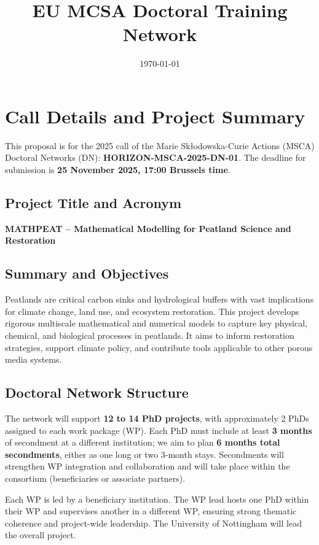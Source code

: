 \documentclass[12pt]{article}
\title{EU MCSA Doctoral Training Network}
\author{}
\date{\today}
\begin{document}
\maketitle

\section*{Call Details and Project Summary}

This proposal is for the 2025 call of the Marie Skłodowska-Curie Actions (MSCA) Doctoral Networks (DN): \textbf{HORIZON-MSCA-2025-DN-01}. The deadline for submission is \textbf{25 November 2025, 17:00 Brussels time}.

\subsection*{Project Title and Acronym}
\textbf{MATHPEAT – Mathematical Modelling for Peatland Science and Restoration}

\subsection*{Summary and Objectives}
Peatlands are critical carbon sinks and hydrological buffers with vast implications for climate change, land use, and ecosystem restoration. This project develops rigorous multiscale mathematical and numerical models to capture key physical, chemical, and biological processes in peatlands. It aims to inform restoration strategies, support climate policy, and contribute tools applicable to other porous media systems.

\subsection*{Doctoral Network Structure}
The network will support \textbf{12 to 14 PhD projects}, with approximately 2 PhDs assigned to each work package (WP). Each PhD must include at least \textbf{3 months} of secondment at a different institution; we aim to plan \textbf{6 months total secondments}, either as one long or two 3-month stays. Secondments will strengthen WP integration and collaboration and will take place within the consortium (beneficiaries or associate partners).

Each WP is led by a beneficiary institution. The WP lead hosts one PhD within their WP and supervises another in a different WP, ensuring strong thematic coherence and project-wide leadership. The University of Nottingham will lead the overall project.
\end{document}
